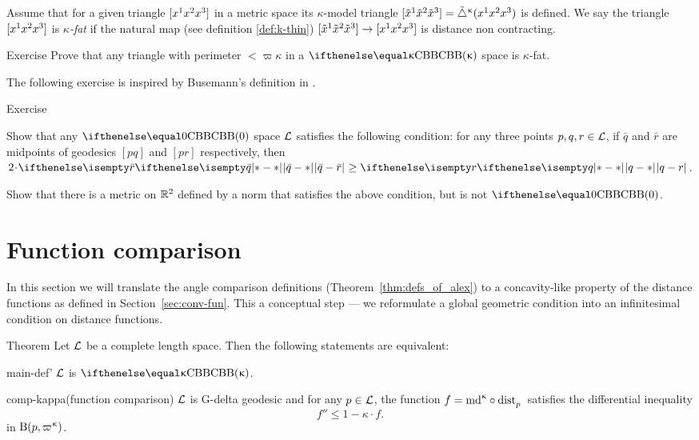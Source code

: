Assume that for a given triangle $[{x^1}{x^2}{x^3}]$ in a metric space its $\kappa$-model triangle
$[{\tilde x^1}{\tilde x^2}{\tilde x^3}]={\tilde\triangle}^{\upkappa}({x^1}{x^2}{x^3})$ is defined.
We say the triangle $[{x^1}{x^2}{x^3}]$ is \emph{$\kappa$-fat} if the natural map (see definition \ref{def:k-thin}) 
$\trig{\tilde x^1}{\tilde x^2}{\tilde x^3}\to \trig{x^1}{x^2}{x^3}$ is distance non contracting.

\begin{thm}{Exercise}\label{ex:fat-triangle}
Prove that any triangle with perimeter $<\varpi\kappa$ 
in a $\Alex{\kappa}$ space is $\kappa$-fat.
\end{thm}

The following exercise is inspired by Busemann's definition in \cite{busemann-CBA}. 

\begin{thm}{Exercise}\label{ex:busemann}

\begin{subthm}{}
Show that any $\Alex0$ space $\mathcal{L}$ satisfies the following condition:
for any three points $p,q,r\in \spc{L}$, if $\bar q$ and $\bar r$ are midpoints of geodesics $[p q]$ and $[p r]$ respectively, then $2\cdot\dist[{{}}]{\bar q}{\bar r}{}\ge\dist{q}{r}{}$.
\end{subthm}

\begin{subthm}{} Show that there is a metric on $\mathbb{R}^2$ defined by a norm that satisfies the above condition, but is not $\Alex0$.
\end{subthm}

\end{thm}


\section{Function comparison} \label{sec:func-comp-CBB}

In this section we will translate the angle comparison definitions (Theorem~\ref{thm:defs_of_alex}) 
to a concavity-like property of the distance functions as defined in Section~\ref{sec:conv-fun}.
This a conceptual step ---
we reformulate a global geometric condition into an infinitesimal condition on distance functions.


\begin{thm}{Theorem}\label{thm:conc} 
Let $\mathcal{L}$ be a complete length space. 
Then the following 
statements are equivalent:

\begin{subthm}{main-def'} $\mathcal{L}$ is $\Alex\kappa$.
\end{subthm}

\begin{subthm}{comp-kappa}(function comparison) $\mathcal{L}$ is  G-delta geodesic and for any $p\in \spc{L}$, the function $f=\md\kappa\circ\distfun{p}{}{}$ satisfies the differential inequality
\[f''\le 1-\kappa\cdot f.\]
in $\oBall(p,\varpi\kappa)$.
\end{subthm}
\end{thm}

